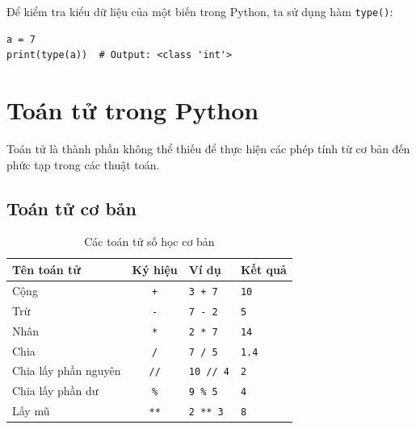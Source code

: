 Để kiểm tra kiểu dữ liệu của một biến trong Python, ta sử dụng hàm \texttt{type()}:

\begin{lstlisting}[caption={Kiểm tra kiểu dữ liệu}]
a = 7
print(type(a))  # Output: <class 'int'>
\end{lstlisting}

\section{Toán tử trong Python}

Toán tử là thành phần không thể thiếu để thực hiện các phép tính từ cơ bản đến phức tạp trong các thuật toán.

\subsection{Toán tử cơ bản}
\begin{table}[h]
\centering
\begin{tabular}{|l|c|l|l|}
\hline
\textbf{Tên toán tử} & \textbf{Ký hiệu} & \textbf{Ví dụ} & \textbf{Kết quả} \\
\hline
Cộng & \texttt{+} & \texttt{3 + 7} & \texttt{10} \\
\hline
Trừ & \texttt{-} & \texttt{7 - 2} & \texttt{5} \\
\hline
Nhân & \texttt{*} & \texttt{2 * 7} & \texttt{14} \\
\hline
Chia & \texttt{/} & \texttt{7 / 5} & \texttt{1.4} \\
\hline
Chia lấy phần nguyên & \texttt{//} & \texttt{10 // 4} & \texttt{2} \\
\hline
Chia lấy phần dư & \texttt{\%} & \texttt{9 \% 5} & \texttt{4} \\
\hline
Lấy mũ & \texttt{**} & \texttt{2 ** 3} & \texttt{8} \\
\hline
\end{tabular}
\caption{Các toán tử số học cơ bản}
\end{table}

